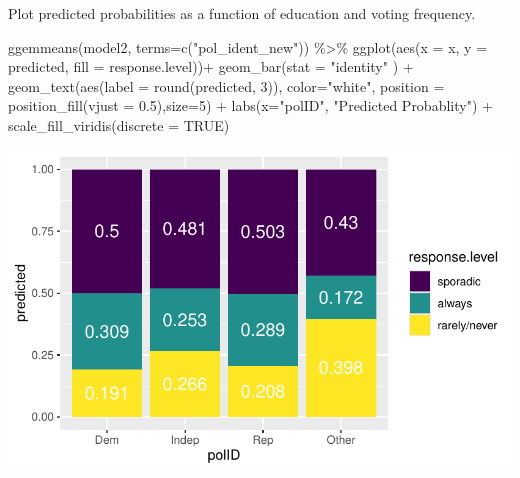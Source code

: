 \documentclass[
  letterpaper,
  DIV=11,
  numbers=noendperiod]{scrartcl}
\newenvironment{Shaded}{\begin{snugshade}}{\end{snugshade}}
\newcommand{\AttributeTok}[1]{\textcolor[rgb]{0.40,0.45,0.13}{#1}}
\newcommand{\ConstantTok}[1]{\textcolor[rgb]{0.56,0.35,0.01}{#1}}
\newcommand{\DecValTok}[1]{\textcolor[rgb]{0.68,0.00,0.00}{#1}}
\newcommand{\FloatTok}[1]{\textcolor[rgb]{0.68,0.00,0.00}{#1}}
\newcommand{\FunctionTok}[1]{\textcolor[rgb]{0.28,0.35,0.67}{#1}}
\newcommand{\NormalTok}[1]{\textcolor[rgb]{0.00,0.23,0.31}{#1}}
\newcommand{\SpecialCharTok}[1]{\textcolor[rgb]{0.37,0.37,0.37}{#1}}
\newcommand{\StringTok}[1]{\textcolor[rgb]{0.13,0.47,0.30}{#1}}
\begin{document}
Plot predicted probabilities as a function of education and voting
frequency.

\begin{Shaded}
\begin{Highlighting}[]
\FunctionTok{ggemmeans}\NormalTok{(model2, }\AttributeTok{terms=}\FunctionTok{c}\NormalTok{(}\StringTok{"pol\_ident\_new"}\NormalTok{)) }\SpecialCharTok{\%\textgreater{}\%}
  \FunctionTok{ggplot}\NormalTok{(}\FunctionTok{aes}\NormalTok{(}\AttributeTok{x =}\NormalTok{ x, }\AttributeTok{y =}\NormalTok{ predicted, }\AttributeTok{fill =}\NormalTok{ response.level))}\SpecialCharTok{+}
  \FunctionTok{geom\_bar}\NormalTok{(}\AttributeTok{stat =} \StringTok{"identity"}\NormalTok{ ) }\SpecialCharTok{+} 
   \FunctionTok{geom\_text}\NormalTok{(}\FunctionTok{aes}\NormalTok{(}\AttributeTok{label =} \FunctionTok{round}\NormalTok{(predicted, }\DecValTok{3}\NormalTok{)), }\AttributeTok{color=}\StringTok{"white"}\NormalTok{, }\AttributeTok{position =} \FunctionTok{position\_fill}\NormalTok{(}\AttributeTok{vjust =} \FloatTok{0.5}\NormalTok{),}\AttributeTok{size=}\DecValTok{5}\NormalTok{) }\SpecialCharTok{+} 
  \FunctionTok{labs}\NormalTok{(}\AttributeTok{x=}\StringTok{"polID"}\NormalTok{, }\StringTok{"Predicted Probablity"}\NormalTok{) }\SpecialCharTok{+} 
  \FunctionTok{scale\_fill\_viridis}\NormalTok{(}\AttributeTok{discrete =} \ConstantTok{TRUE}\NormalTok{)}
\end{Highlighting}
\end{Shaded}

\includegraphics{Lab4_multinom_Questions-1_files/figure-pdf/unnamed-chunk-15-1.pdf}
\end{document}

